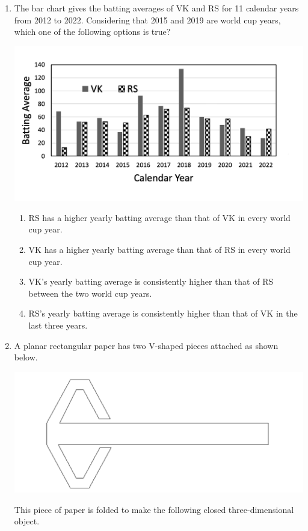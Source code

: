 \documentclass[12pt]{article}
\begin{document}
\begin{enumerate}
\begin{enumerate}
     \item28 
   \item 27 
   \item 18  
   \item 19 
\end{enumerate}


\item The bar chart gives the batting averages of VK and RS for 11 calendar years from
2012 to 2022. Considering that 2015 and 2019 are world cup years, which one of
the following options is true?

\includegraphics[width=0.5\linewidth]{Figs/LatexGraph.png}
    

\begin{enumerate}
     \item RS has a higher yearly batting average than that of VK in every world cup year.  
   \item VK has a higher yearly batting average than that of RS in every world cup year. 
   \item VK’s yearly batting average is consistently higher than that of RS between the two
world cup years.  
   \item  RS’s yearly batting average is consistently higher than that of VK in the last three
years. 
\end{enumerate}



\item A planar rectangular paper has two V-shaped pieces attached as shown below.

\includegraphics[width=0.5\linewidth]{Figs/LatexImage1.png}

This piece of paper is folded to make the following closed three-dimensional object.


\end{enumerate}
\end{document}
